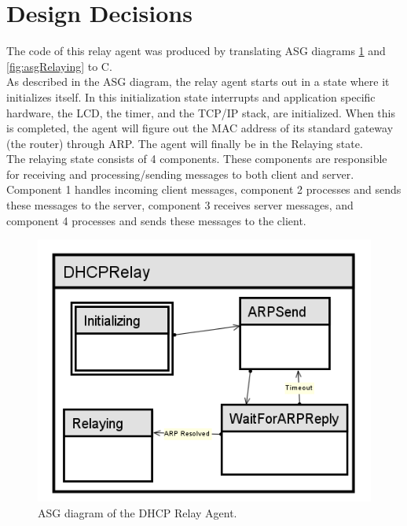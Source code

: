 \documentclass[11pt,a4paper]{scrartcl}
\begin{document}
\section{Design Decisions}

The code of this relay agent was produced by translating ASG diagrams \ref{fig:asg} and \ref{fig:asgRelaying} to C.\\

As described in the ASG diagram, the relay agent starts out in a state where it initializes itself. In this initialization state interrupts and application specific hardware, the LCD, the timer, and the TCP/IP stack, are initialized. When this is completed, the agent will figure out the MAC address of its standard gateway (the router) through ARP. The agent will finally be in the Relaying state.\\

The relaying state consists of 4 components. These components are responsible for receiving and processing/sending messages to both client and server. Component 1 handles incoming client messages, component 2 processes and sends these messages to the server, component 3 receives server messages, and component 4 processes and sends these messages to the client.

\begin{figure}
	\centering
	\includegraphics[width=1.0\textwidth]{../img/dhcprelay-asg.png}
	\caption{ASG diagram of the DHCP Relay Agent.\label{fig:asg}}
\end{figure}
\end{document}
